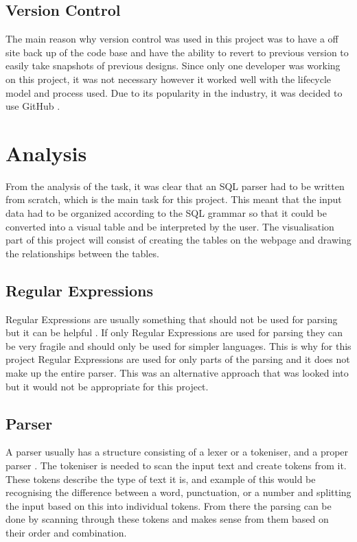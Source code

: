 \subsection{Version Control}

The main reason why version control was used in this project was to have a off site back up of the code base and have the ability to revert to previous version to easily take snapshots of previous designs. Since only one developer was working on this project, it was not necessary however it worked well with the lifecycle model and process used. Due to its popularity in the industry, it was decided to use GitHub \cite{Github}.

\section{Analysis}

From the analysis of the task, it was clear that an SQL parser had to be written from scratch, which is the main task for this project. This meant that the input data had to be organized according to the SQL grammar so that it could be converted into a visual table and be interpreted by the user. The visualisation part of this project will consist of creating the tables on the webpage and drawing the relationships between the tables.

\subsection{Regular Expressions}

Regular Expressions are usually something that should not be used for parsing but it can be helpful \cite{Parsing}. If only Regular Expressions are used for parsing they can be very fragile and should only be used for simpler languages. This is why for this project Regular Expressions are used for only parts of the parsing and it does not make up the entire parser. This was an alternative approach that was looked into but it would not be appropriate for this project.

\subsection{Parser}

A parser usually has a structure consisting of a lexer or a tokeniser, and a proper parser \cite{Parsing}. The tokeniser is needed to scan the input text and create tokens from it. These tokens describe the type of text it is, and example of this would be recognising the difference between a word, punctuation, or a number and splitting the input based on this into individual tokens. From there the parsing can be done by scanning through these tokens and makes sense from them based on their order and combination.

